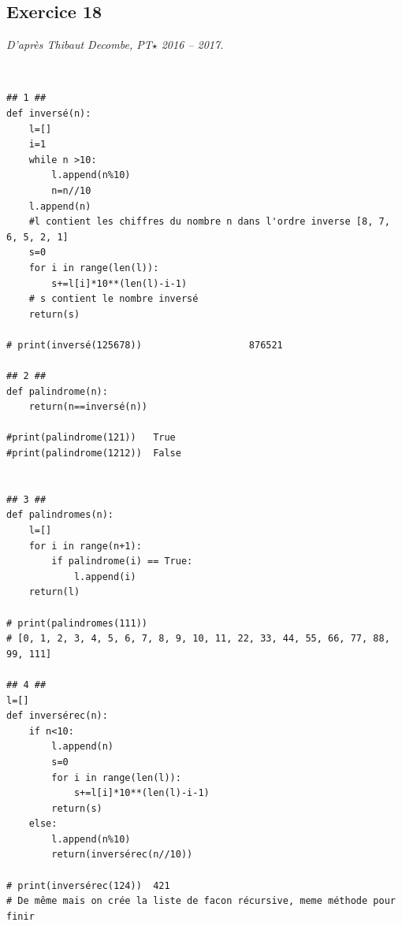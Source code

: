 \documentclass[10pt,fleqn]{article} %
\begin{document}
\subsection*{Exercice 18}
\textit{D'après Thibaut Decombe, PT$\star$ 2016 -- 2017.}
\begin{corrige}
$\quad$
\begin{lstlisting}
## 1 ##
def inversé(n):
    l=[]
    i=1
    while n >10:
        l.append(n%10)
        n=n//10
    l.append(n)
    #l contient les chiffres du nombre n dans l'ordre inverse [8, 7, 6, 5, 2, 1]
    s=0
    for i in range(len(l)):
        s+=l[i]*10**(len(l)-i-1)
    # s contient le nombre inversé
    return(s)

# print(inversé(125678))                   876521

## 2 ##
def palindrome(n):
    return(n==inversé(n))

#print(palindrome(121))   True
#print(palindrome(1212))  False

     
## 3 ##
def palindromes(n):
    l=[]
    for i in range(n+1):
        if palindrome(i) == True:
            l.append(i)
    return(l)

# print(palindromes(111))
# [0, 1, 2, 3, 4, 5, 6, 7, 8, 9, 10, 11, 22, 33, 44, 55, 66, 77, 88, 99, 111]

## 4 ##
l=[]
def inversérec(n):
    if n<10:
        l.append(n)
        s=0
        for i in range(len(l)):
            s+=l[i]*10**(len(l)-i-1)
        return(s)
    else:
        l.append(n%10)
        return(inversérec(n//10))

# print(inversérec(124))  421    
# De même mais on crée la liste de facon récursive, meme méthode pour finir
\end{lstlisting}
\end{corrige}
\end{document}
